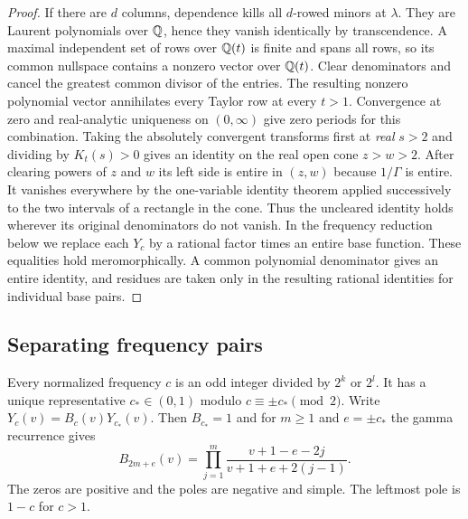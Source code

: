 \begin{proof}
If there are $d$ columns, dependence kills all $d$-rowed minors at $\lambda$. They are Laurent polynomials over \(\mathbb Q\), hence they vanish identically by transcendence. A maximal independent set of rows over $\mathbb Q(t)$ is finite and spans all rows, so its common nullspace contains a nonzero vector over $\mathbb Q(t)$. Clear denominators and cancel the greatest common divisor of the entries. The resulting nonzero polynomial vector annihilates every Taylor row at every $t>1$. Convergence at zero and real-analytic uniqueness on $(0,\infty)$ give zero periods for this combination. Taking the absolutely convergent transforms first at \emph{real} $s>2$ and dividing by $K_t(s)>0$ gives an identity on the real open cone $z>w>2$. After clearing powers of $z$ and $w$ its left side is entire in $(z,w)$ because $1/\Gamma$ is entire. It vanishes everywhere by the one-variable identity theorem applied successively to the two intervals of a rectangle in the cone. Thus the uncleared identity holds wherever its original denominators do not vanish. In the frequency reduction below we replace each \(Y_c\) by a rational factor times an entire base function. These equalities hold meromorphically. A common polynomial denominator gives an entire identity, and residues are taken only in the resulting rational identities for individual base pairs.
\end{proof}

\subsection{Separating frequency pairs}
Every normalized frequency $c$ is an odd integer divided by $2^k$ or $2^l$. It has a unique representative $c_*\in(0,1)$ modulo $c\equiv\pm c_*\pmod2$. Write $Y_c(v)=B_c(v)Y_{c_*}(v)$. Then $B_{c_*}=1$ and for $m\ge1$ and $e=\pm c_*$ the gamma recurrence gives
\begin{equation}\label{eq:shift}
 B_{2m+e}(v)=\prod_{j=1}^m\frac{v+1-e-2j}{v+1+e+2(j-1)} .
\end{equation}
The zeros are positive and the poles are negative and simple. The leftmost pole is $1-c$ for $c>1$.

